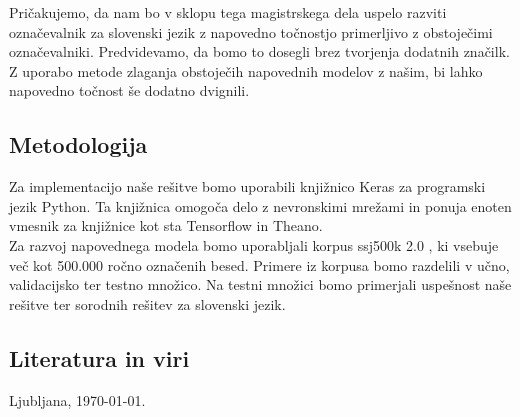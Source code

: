 \documentclass[a4paper, 12pt]{article}
\begin{document}
Pričakujemo, da nam bo v sklopu tega magistrskega dela uspelo razviti označevalnik za slovenski jezik z napovedno točnostjo primerljivo z obstoječimi označevalniki. Predvidevamo, da bomo to dosegli brez tvorjenja dodatnih značilk.
Z  uporabo metode zlaganja obstoječih napovednih modelov z našim, bi lahko napovedno točnost še dodatno dvignili.

\subsection{Metodologija}

Za implementacijo naše rešitve bomo uporabili knjižnico Keras za programski jezik Python. Ta knjižnica omogoča delo z nevronskimi mrežami in ponuja enoten vmesnik za knjižnice kot sta Tensorflow in Theano.\\
Za razvoj napovednega modela bomo uporabljali korpus ssj500k 2.0 \cite{ssj500kv2}, ki vsebuje več kot 500.000 ročno označenih besed. Primere iz korpusa bomo razdelili v učno, validacijsko ter testno množico. Na testni množici bomo primerjali uspešnost naše rešitve ter sorodnih rešitev za slovenski jezik.

\subsection{Literatura in viri}
\label{literatura}

\renewcommand\refname{}
\vspace{-50px}




\bigskip

Ljubljana, \today .
\end{document}
